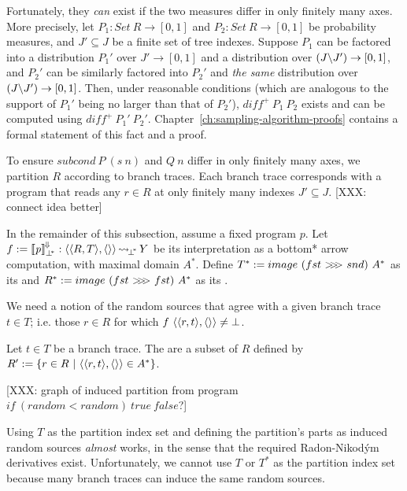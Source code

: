 Fortunately, they \emph{can} exist if the two measures differ in only finitely many axes.
More precisely, let $P_1 : Set~R \to [0,1]$ and $P_2 : Set~R \to [0,1]$ be probability measures, and $J' \subseteq J$ be a finite set of tree indexes.
Suppose $P_1$ can be factored into a distribution $P_1'$ over $J' \to [0,1]$ and a distribution over $(J \backslash J') \to [0,1]$, and $P_2'$ can be similarly factored into $P_2'$ and \emph{the same} distribution over $(J \backslash J') \to [0,1]$.
Then, under reasonable conditions (which are analogous to the support of $P_1'$ being no larger than that of  $P_2'$), $diff^+~P_1~P_2$ exists and can be computed using $diff^+~P_1'~P_2'$.
Chapter~\ref{ch:sampling-algorithm-proofs} contains a formal statement of this fact and a proof.

To ensure $subcond~P~(s~n)$ and $Q~n$ differ in only finitely many axes, we partition $R$ according to branch traces.
Each branch trace corresponds with a program that reads any $r \in R$ at only finitely many indexes $J' \subseteq J$.
[XXX: connect idea better]

In the remainder of this subsection, assume a fixed program $\mathit{p}$. Let $f := \left\llbracket{\mathit{p}}\right\rrbracket^{\mspace{-2mu}\Downarrow\mspace{-2mu}}_{\bot^{\mspace{-4mu}*}} : \langle{\langle{R,T}\rangle,\langle{}\rangle}\rangle \operatorname{\rightsquigarrow_{\mspace{-3mu}{\bot^{\mspace{-4mu}*}}}} Y$ be its interpretation as a bottom* arrow computation, with maximal domain $A^*$.
Define $T^* := image~(fst~{>}\mspace{-6mu}{>}\mspace{-6mu}{>}~snd)~A^*$ as its  and
$R^* := image~(fst~{>}\mspace{-6mu}{>}\mspace{-6mu}{>}~fst)~A^*$ as its .

We need a notion of the random sources that agree with a given branch trace $t \in T$; i.e. those $r \in R$ for which $f~\langle{\langle{r,t}\rangle,\langle{}\rangle}\rangle \neq \bot$.

\begin{definition}
\label{def:induced-random-sources}
Let $t \in T$ be a branch trace. The  are a subset of $R$ defined by
$R' := \lbrace {r \in R} \ \lvert\ {\langle{\langle{r,t}\rangle,\langle{}\rangle}\rangle \in A^*} \rbrace$.
\end{definition}

[XXX: graph of induced partition from program $if~(random < random)~true~false$?]

Using $T$ as the partition index set and defining the partition's parts as induced random sources \emph{almost} works, in the sense that the required Radon-Nikod\'ym derivatives exist.
Unfortunately, we cannot use $T$ or $T^*$ as the partition index set because many branch traces can induce the same random sources.

